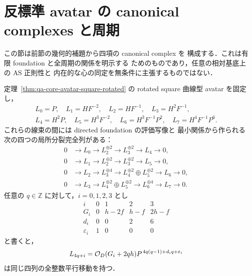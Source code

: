 \section{反標準 avatar の canonical complexes と周期}
\label{sec:qa-self-contained-helix}

この節は前節の幾何的補題から四項の canonical complex を
構成する．これは有限 foundation と全周期の関係を明示する
ためのものであり，任意の相対基底上の AS 正則性と
内在的な心の同定を無条件に主張するものではない．

\begin{proposition}
\label{prop:qa-core-rotated-complexes}
定理~\ref{thm:qa-core-avatar-square-rotated} の
rotated square 曲線型 avatar を固定し，
\[
\begin{gathered}
L_0=P,\quad L_1=HF^{-2},\quad
L_2=HF^{-1},\quad L_3=H^2F^{-1},\\
L_4=H^2P,\quad L_5=H^3F^{-2},\quad
L_6=H^3F^{-1}P^2,\quad L_7=H^4F^{-1}P^6 .
\end{gathered}
\]
これらの線束の間には directed foundation の評価写像と
最小関係から作られる次の四つの局所分裂完全列がある：
\begin{align}
0&\to L_0\to L_2^{\oplus2}\to L_3^{\oplus2}
     \to L_4\to0,\label{eq:qa-core-rsq-complex0}\\
0&\to L_1\to L_2^{\oplus2}\to L_3^{\oplus2}
     \to L_5\to0,\label{eq:qa-core-rsq-complex1}\\
0&\to L_2\to L_3^{\oplus4}
     \to L_4^{\oplus2}\oplus L_5^{\oplus2}
     \to L_6\to0,\label{eq:qa-core-rsq-complex2}\\
0&\to L_3\to L_4^{\oplus2}\oplus L_5^{\oplus2}
     \to L_6^{\oplus4}\to L_7\to0.
     \label{eq:qa-core-rsq-complex3}
\end{align}
任意の $q\in\mathbb Z$ に対して，$i=0,1,2,3$ とし
\[
\begin{array}{c|cccc}
i&0&1&2&3\\ \hline
G_i&0&h-2f&h-f&2h-f\\
d_i&0&0&2&6\\
\varepsilon_i&1&0&0&0
\end{array}
\]
と書くと，
\begin{equation}
L_{4q+i}=\mathcal O_D(G_i+2qh)
           P^{\,4q(q-1)+d_iq+\varepsilon_i}
\label{eq:qa-core-rsq-periodic-L}
\end{equation}
は同じ四列の全整数平行移動を持つ．
\end{proposition}
